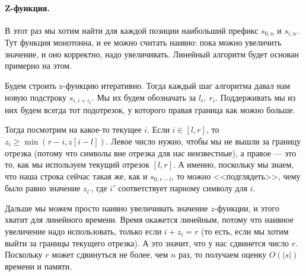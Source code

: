 \documentclass[12pt]{article}
\begin{document}
\paragraph{Z-функция.} В этот раз мы хотим найти для каждой позиции наибольший префикс $s_{0, n}$ и $s_{i, n}$. Тут функция монотонна, и ее можно считать наивно: пока можно увеличить значение, и оно корректно, надо увеличивать. Линейный алгоритм будет основан примерно на этом.

Будем строить z-функцию итеративно. Тогда каждый шаг алгоритма давал нам новую подстроку $s_{i, i + z_i}$. Мы их будем обозначать за $l_i,\ r_i$. Поддерживать мы из них будем всегда тот подотрезок, у которого правая граница как можно больше.

Тогда посмотрим на какое-то текущее $i$. Если $i \in [l, r]$, то $z_i \ge \min(r - i, z[i - l])$. Левое число нужно, чтобы мы не вышли за границу отрезка (потому что символы вне отрезка для нас неизвестные), а правое --- это то, как мы используем текущий отрезок $[l, r]$. А именно, поскольку мы знаем, что наша строка сейчас такая же, как и $s_{0, r - l}$, то можно <<подглядеть>>, чему было равно значение $z_{i'}$, где $i'$ соответствует парному символу для $i$.

Дальше мы можем просто наивно увеличивать значение $z$-функции, и этого хватит для линейного времени. Время окажется линейным, потому что наивное увеличение надо использовать, только если $i + z_i = r$ (то есть, если мы хотим выйти за границы текущего отрезка). А это значит, что у нас сдвинется число $r$. Поскольку $r$ может сдвинуться не более, чем $n$ раз, то получаем оценку $O(|s|)$ времени и памяти.
\end{document}
